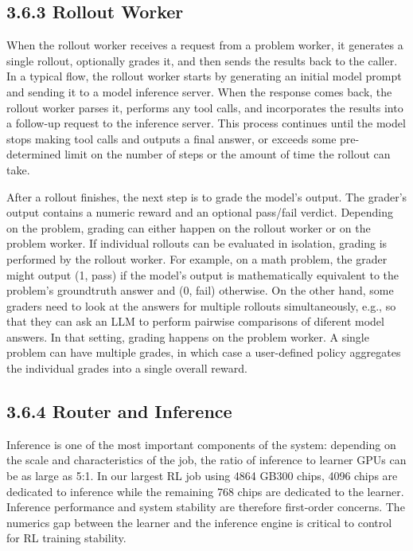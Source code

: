 \documentclass[
  10
]{article}
\begin{document}
\subsection{3.6.3 Rollout Worker}\label{rollout-worker}

When the rollout worker receives a request from a problem worker, it
generates a single rollout, optionally grades it, and then sends the
results back to the caller. In a typical flow, the rollout worker starts
by generating an initial model prompt and sending it to a model
inference server. When the response comes back, the rollout worker
parses it, performs any tool calls, and incorporates the results into a
follow-up request to the inference server. This process continues until
the model stops making tool calls and outputs a final answer, or exceeds
some pre-determined limit on the number of steps or the amount of time
the rollout can take.

After a rollout finishes, the next step is to grade the model's output.
The grader's output contains a numeric reward and an optional pass/fail
verdict. Depending on the problem, grading can either happen on the
rollout worker or on the problem worker. If individual rollouts can be
evaluated in isolation, grading is performed by the rollout worker. For
example, on a math problem, the grader might output (1, pass) if the
model's output is mathematically equivalent to the problem's groundtruth
answer and (0, fail) otherwise. On the other hand, some graders need to
look at the answers for multiple rollouts simultaneously, e.g., so that
they can ask an LLM to perform pairwise comparisons of diferent model
answers. In that setting, grading happens on the problem worker. A
single problem can have multiple grades, in which case a user-defined
policy aggregates the individual grades into a single overall reward.

\subsection{3.6.4 Router and Inference}\label{router-and-inference}

Inference is one of the most important components of the system:
depending on the scale and characteristics of the job, the ratio of
inference to learner GPUs can be as large as 5:1. In our largest RL job
using 4864 GB300 chips, 4096 chips are dedicated to inference while the
remaining 768 chips are dedicated to the learner. Inference performance
and system stability are therefore first-order concerns. The numerics
gap between the learner and the inference engine is critical to control
for RL training stability.
\end{document}
